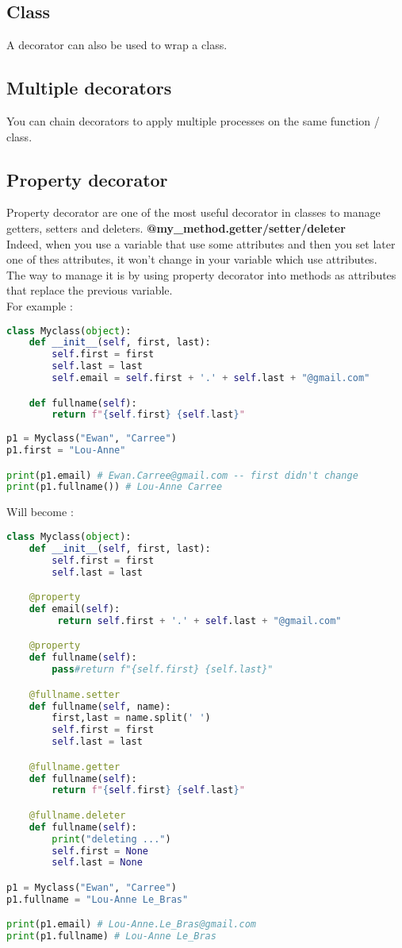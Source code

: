 \documentclass[a4paper, 12pt, titlepage]{scrartcl} %
\begin{document}
\subsection{Class}
A decorator can also be used to wrap a class.

\subsection{Multiple decorators}
You can chain decorators to apply multiple processes on the same function / class.

\subsection{Property decorator}
\label{subsec:Property}
Property decorator are one of the most useful decorator in classes to manage getters, setters and deleters. \textbf{@my\_method.getter/setter/deleter}\\
Indeed, when you use a variable that use some attributes and then you set later one of thes attributes, it won't change in your variable which use attributes. \\
The way to manage it is by using property decorator into methods as attributes that replace the previous variable. \\
For example :
\begin{lstlisting}[language=Python]
class Myclass(object):
	def __init__(self, first, last):
		self.first = first
		self.last = last
		self.email = self.first + '.' + self.last + "@gmail.com"

	def fullname(self):
		return f"{self.first} {self.last}"
		
p1 = Myclass("Ewan", "Carree")
p1.first = "Lou-Anne"

print(p1.email) # Ewan.Carree@gmail.com -- first didn't change
print(p1.fullname()) # Lou-Anne Carree
\end{lstlisting}
Will become :
\begin{lstlisting}[language=Python]
class Myclass(object):
	def __init__(self, first, last):
		self.first = first
		self.last = last

	@property
	def email(self):
		 return self.first + '.' + self.last + "@gmail.com"

	@property
	def fullname(self):
		pass#return f"{self.first} {self.last}"

	@fullname.setter
	def fullname(self, name):
		first,last = name.split(' ')
		self.first = first
		self.last = last

	@fullname.getter
	def fullname(self):
		return f"{self.first} {self.last}"

	@fullname.deleter
	def fullname(self):
		print("deleting ...")
		self.first = None
		self.last = None

p1 = Myclass("Ewan", "Carree")
p1.fullname = "Lou-Anne Le_Bras"

print(p1.email) # Lou-Anne.Le_Bras@gmail.com
print(p1.fullname) # Lou-Anne Le_Bras
\end{lstlisting}
\end{document}
